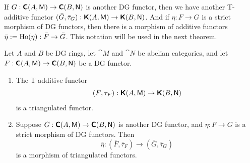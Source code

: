 If
$G : \boldsymbol{\mathsf{C}}(A, \operatorname{\mathsf{M}}) \to \boldsymbol{\mathsf{C}}(B, \operatorname{\mathsf{N}})$
is another DG functor, then we have another T-additive functor 
$(\bar{G}, \bar{\tau}_G) :  \boldsymbol{\mathsf{K}}(A, \operatorname{\mathsf{M}}) \to \boldsymbol{\mathsf{K}}(B, \operatorname{\mathsf{N}})$.
And if $\eta : F \to G$ is a strict morphism of DG functors, then there is a 
morphism of additive functors 
$\bar{\eta} := \operatorname{Ho}(\eta) : \bar{F} \to \bar{G}$.
This notation will be used in the next theorem. 

\begin{thm} \label{thm:1265}
Let $A$ and $B$ be DG rings, let $\cat{M}$ and $\cat{N}$ be abelian categories, 
and let 
$F : \boldsymbol{\mathsf{C}}(A, \operatorname{\mathsf{M}}) \to \boldsymbol{\mathsf{C}}(B, \operatorname{\mathsf{N}})$
be a DG functor. 
\begin{enumerate}
\item The T-additive functor  
\[ (\bar{F}, \bar{\tau}_F) :  \boldsymbol{\mathsf{K}}(A, \operatorname{\mathsf{M}}) \to \boldsymbol{\mathsf{K}}(B, \operatorname{\mathsf{N}}) \]
is a triangulated functor. 

\item Suppose 
$G : \boldsymbol{\mathsf{C}}(A, \operatorname{\mathsf{M}}) \to \boldsymbol{\mathsf{C}}(B, \operatorname{\mathsf{N}})$
is another DG functor, and $\eta : F \to G$ is a strict morphism of DG functors.
Then 
\[ \bar{\eta} : (\bar{F}, \bar{\tau}_F) \to (\bar{G}, \bar{\tau}_G) \]
is a morphism of triangulated functors. 
\end{enumerate}
\end{thm}

